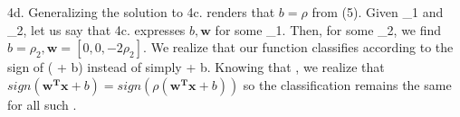 \documentclass{article}
\begin{document}
4d.
Generalizing the solution to 4c. renders that \(b = \rho\)\) from (5). Given \rho_1
and \rho_2, let us say that 4c. expresses \(b, \mathbf{w}\) for some \rho_1. Then,
for some \rho_2, we find \(b = \rho_2, \mathbf{w} = [0,0,-2\rho_2]\). We realize that
our function classifies according to the sign of \rho( + b) instead of
simply  + b. Knowing that \rho {}, we realize that
\(sign(\mathbf{w^Tx} + b) = sign(\rho(\mathbf{w^Tx} + b))\) so the classification
remains the same for all such \rho.
\end{document}
